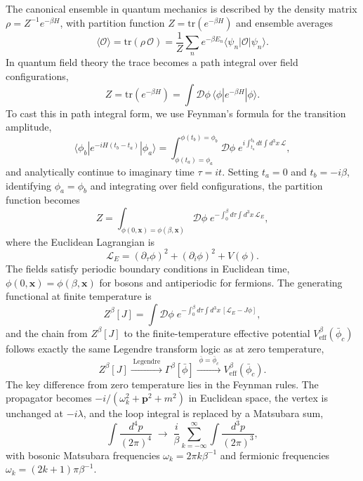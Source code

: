 The canonical ensemble in quantum mechanics is described by the density
matrix $\rho = Z^{-1}e^{-\beta H}$, with partition function
$Z = \mathrm{tr}(e^{-\beta H})$ and ensemble averages
\begin{equation}
	\langle\mathcal{O}\rangle
	= \mathrm{tr}(\rho\,\mathcal{O})
	= \frac{1}{Z}\sum_n e^{-\beta E_n}
	\langle\psi_n|\mathcal{O}|\psi_n\rangle.
\end{equation}
In quantum field theory the trace becomes a path integral over field
configurations,
\begin{equation}
	Z = \mathrm{tr}(e^{-\beta H})
	= \int\mathcal{D}\phi\,\langle\phi|e^{-\beta H}|\phi\rangle.
\end{equation}
To cast this in path integral form, we use Feynman's formula for the
transition amplitude,
\begin{equation}
	\langle\phi_b|e^{-iH(t_b-t_a)}|\phi_a\rangle
	= \int_{\phi(t_a)=\phi_a}^{\phi(t_b)=\phi_b}
	\mathcal{D}\phi\;
	e^{i\int_{t_a}^{t_b}dt\int d^3x\,\mathcal{L}},
\end{equation}
and analytically continue to imaginary time $\tau = it$. Setting
$t_a=0$ and $t_b = -i\beta$, identifying $\phi_a = \phi_b$ and
integrating over field configurations, the partition function becomes
\begin{equation}
	Z = \int_{\phi(0,\mathbf{x})=\phi(\beta,\mathbf{x})}
	\mathcal{D}\phi\;
	e^{-\int_0^\beta d\tau\int d^3x\,\mathcal{L}_E},
\end{equation}
where the Euclidean Lagrangian is
\begin{equation}
	\mathcal{L}_E = (\partial_\tau\phi)^2
	+ (\partial_i\phi)^2 + V(\phi).
\end{equation}
The fields satisfy periodic boundary conditions in Euclidean time,
$\phi(0,\mathbf{x}) = \phi(\beta,\mathbf{x})$ for bosons and
antiperiodic for fermions. The generating functional at finite
temperature is
\begin{equation}
	Z^\beta[J] = \int\mathcal{D}\phi\;
	e^{-\int_0^\beta d\tau\int d^3x\,
			[\mathcal{L}_E - J\phi]},
\end{equation}
and the chain from $Z^\beta[J]$ to the finite-temperature effective
potential $V_{\text{eff}}^\beta(\bar\phi_c)$ follows exactly the same
Legendre transform logic as at zero temperature,
\begin{equation}
	Z^\beta[J]
	\xrightarrow{\;\text{Legendre}\;}
	\Gamma^\beta[\bar\phi]
	\xrightarrow{\;\bar\phi=\bar\phi_c\;}
	V_{\text{eff}}^\beta(\bar\phi_c).
\end{equation}
The key difference from zero temperature lies in the Feynman rules. The
propagator becomes $-i/(\omega_k^2 + \mathbf{p}^2 + m^2)$ in Euclidean
space, the vertex is unchanged at $-i\lambda$, and the loop integral is
replaced by a Matsubara sum,
\begin{equation}
	\int\frac{d^4p}{(2\pi)^4}
	\;\longrightarrow\;
	\frac{i}{\beta}\sum_{k=-\infty}^{\infty}
	\int\frac{d^3p}{(2\pi)^3},
\end{equation}
with bosonic Matsubara frequencies $\omega_k = 2\pi k\beta^{-1}$ and
fermionic frequencies $\omega_k = (2k+1)\pi\beta^{-1}$.

